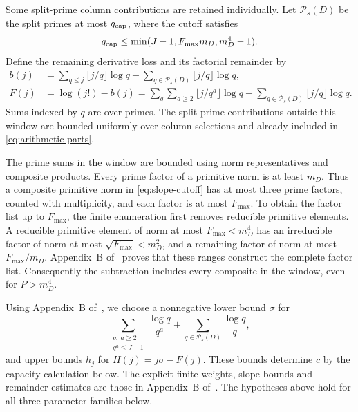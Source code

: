 Some split-prime column contributions are retained individually. Let
$\mathcal P_s(D)$ be the split primes at most $q_{\rm cap}$, where the
cutoff satisfies
\begin{equation}\label{eq:slope-cutoff}
 q_{\rm cap}\leq\min(J-1,F_{\max}m_D,m_D^4-1).
\end{equation}
Define the remaining derivative loss and its factorial remainder by
\begin{equation}\label{eq:arithmetic-debit}
 \begin{split}
 b(j)&=\sum_{q\leq j}\lfloor j/q\rfloor\log q
       -\sum_{q\in\mathcal P_s(D)}\lfloor j/q\rfloor\log q,\\
 F(j)&=\log(j!)-b(j)
       =\sum_q\sum_{a\geq2}\lfloor j/q^a\rfloor\log q
        +\sum_{q\in\mathcal P_s(D)}\lfloor j/q\rfloor\log q.
 \end{split}
\end{equation}
Sums indexed by $q$ are over primes. The split-prime contributions outside this
window are bounded uniformly over column selections and already included
in \eqref{eq:arithmetic-parts}.

The prime sums in the window are bounded using norm representatives and
composite products. Every prime factor of a primitive norm is at least
$m_D$. Thus a composite primitive norm in \eqref{eq:slope-cutoff} has at most
three prime factors, counted with multiplicity, and each factor is at
most $F_{\max}$. To obtain the factor list up to $F_{\max}$, the finite enumeration
first removes reducible primitive elements. A reducible
primitive element of norm at most $F_{\max}<m_D^4$ has an irreducible factor
of norm at most $\sqrt{F_{\max}}<m_D^2$, and a remaining factor of norm at
most $F_{\max}/m_D$. Appendix~B of~\cite{chung498} proves that these ranges construct the complete factor list. Consequently the subtraction includes every
composite in the window, even for $P>m_D^4$.

Using Appendix~B of~\cite{chung498}, we choose a nonnegative lower bound $\sigma$ for
\[
 \sum_{\substack{q,\ a\geq2\\q^a\leq J-1}}\frac{\log q}{q^a}
       +\sum_{q\in\mathcal P_s(D)}\frac{\log q}{q},
\]
and upper bounds $h_j$ for $H(j)=j\sigma-F(j)$.
These bounds determine $c$ by the capacity calculation below.
The explicit finite weights, slope bounds and remainder estimates are
those in Appendix~B of~\cite{chung498}. The hypotheses above hold for all three parameter
families below.
